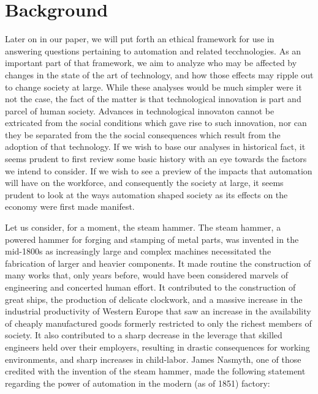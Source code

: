\section{Background}
\label{sec:-background}

Later on in our paper, we will put forth an ethical framework for use 
in answering questions pertaining to automation and related tecchnologies. 
As an important part of that framework, we aim to analyze who may be 
affected by changes in the state of the art of technology, and how 
those effects may ripple out to change society at large.  While these 
analyses would be much simpler were it not the case, the fact of the 
matter is that technological innovation is part and parcel of human 
society.  Advances in technological innovaton cannot be extricated from 
the social conditions which gave rise to such innovation, nor can 
they be separated from the the social consequences which result from 
the adoption of that technology.  If we wish to base 
our analyses in historical fact, it seems prudent to first review some 
basic history with an eye towards the factors we intend to consider.  
If we wish to see a preview of the impacts that automation will have 
on the workforce, and consequently the society at large, it seems 
prudent to look at the ways automation shaped society as its effects 
on the economy were first made manifest.

Let us consider, for a moment, the steam hammer. The steam hammer, a 
powered hammer for forging and 
stamping of metal parts, was invented in the mid-1800s as increasingly 
large and complex machines necessitated the fabrication of larger and 
heavier components.  It made routine the construction of many works 
that, only years before, would have been considered marvels of 
engineering and concerted human effort.  It contributed to the construction 
of great ships, the production of delicate clockwork, and a massive 
increase in the industrial productivity of Western Europe that saw an 
increase in the availability of cheaply manufactured goods formerly 
restricted to only the richest members of society.  It also 
contributed\cite{gaskell1833manufacturing} to a sharp decrease in the 
leverage that skilled engineers held over their employers, resulting in 
drastic consequences for working environments, and sharp increases in 
child-labor.  James Nasmyth, one of those credited with the invention 
of the steam hammer, made the following statement regarding the power 
of automation in the modern (as of 1851) factory:

